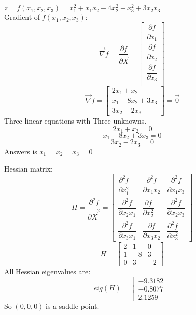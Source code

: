 $z = f(x_1, x_2, x_3) = x_1^2 + x_1x_2 - 4x_2^2-x_3^2 + 3x_2x_3$ \\
Gradient of $f(x_1, x_2, x_3)$:
$$\vec{\nabla} f = \dfrac{\partial f}{\partial \vec{X}}= \begin{bmatrix}
	\dfrac{\partial f}{\partial x_1} \\[8pt]
	\dfrac{\partial f}{\partial x_2} \\[8pt]
	\dfrac{\partial f}{\partial x_3} \\
\end{bmatrix} $$
$$\vec{\nabla} f =   \begin{bmatrix}
	2x_1 + x_2 \\
	x_1 -8x_2 + 3x_3 \\
	3x_2 - 2x_3
\end{bmatrix}  = \vec{0}$$
Three linear equations with Three unknowns.
$$	2x_1 + x_2 = 0 $$
$$x_1 -8x_2 + 3x_3 = 0$$
$$3x_2 - 2x_3 = 0 $$
Answers is $x_1 = x_2 = x_3 = 0$


Hessian matrix:
$$H = \dfrac{\partial^2 f}{\partial \vec{X}^2} = \begin{bmatrix}
	\dfrac{\partial^2 f}{\partial x_1^2} & \dfrac{\partial^2 f}{\partial x_1x_2} & \dfrac{\partial^2 f}{\partial x_1x_3} \\[8pt]
	\dfrac{\partial^2 f}{\partial x_2x_1}  & \dfrac{\partial f}{\partial x_2^2} & \dfrac{\partial^2 f}{\partial x_2x_3}  \\[8pt]
		\dfrac{\partial^2 f}{\partial x_3x_1}  & \dfrac{\partial f}{\partial x_3x_2} & \dfrac{\partial^2 f}{\partial x_3^2} 
\end{bmatrix} $$
$$H = \begin{bmatrix}
	2 & 1 & 0 \\
	1 & -8 & 3 \\
	0 & 3 & -2
\end{bmatrix}$$
All Hessian eigenvalues are:
$$eig(H) = \begin{bmatrix}
	-9.3182  \\
	-0.8077 \\
	2.1259
\end{bmatrix}$$
So $(0, 0, 0)$ is a saddle point.
